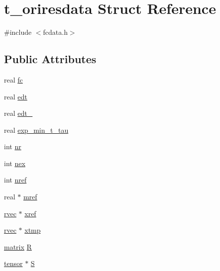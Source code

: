 \hypertarget{structt__oriresdata}{\section{t\-\_\-oriresdata \-Struct \-Reference}
\label{structt__oriresdata}
}


{\ttfamily \#include $<$fcdata.\-h$>$}

\subsection*{\-Public \-Attributes}
\begin{DoxyCompactItemize}
\item 
real \hyperlink{structt__oriresdata_a3f53eeced8bb470f9e6744c13094cb4a}{fc}
\item 
real \hyperlink{structt__oriresdata_ac62c4c96f4e26c89a5064d59eb731297}{edt}
\item 
real \hyperlink{structt__oriresdata_a129d5bae4c3e45c575cba5061f280252}{edt\-\_}
\item 
real \hyperlink{structt__oriresdata_aafe5f0c9333cdecf519edcde680afa3e}{exp\-\_\-min\-\_\-t\-\_\-tau}
\item 
int \hyperlink{structt__oriresdata_a9f809185adac20eb8ce8337a889e905d}{nr}
\item 
int \hyperlink{structt__oriresdata_a70c1520822ec66ff2d90b456eccfa497}{nex}
\item 
int \hyperlink{structt__oriresdata_a6c0a4cac66b5cdb65b662be59071d507}{nref}
\item 
real $\ast$ \hyperlink{structt__oriresdata_a19cc4db75114e30ae5138f284b109494}{mref}
\item 
\hyperlink{share_2template_2gromacs_2types_2simple_8h_aa02a552a4abd2f180c282a083dc3a999}{rvec} $\ast$ \hyperlink{structt__oriresdata_a04fdaf3b7dfc576cddd0b41cc74738fc}{xref}
\item 
\hyperlink{share_2template_2gromacs_2types_2simple_8h_aa02a552a4abd2f180c282a083dc3a999}{rvec} $\ast$ \hyperlink{structt__oriresdata_ab96af028b5a85f0d219e7905cc8aab70}{xtmp}
\item 
\hyperlink{share_2template_2gromacs_2types_2simple_8h_a7ea9c2a830d3f743b887387e33645a83}{matrix} \hyperlink{structt__oriresdata_ae91a11f0e8e3b388041198ac664892cd}{\-R}
\item 
\hyperlink{share_2template_2gromacs_2types_2simple_8h_aef0bf341f56ce75f09dbb64350488a61}{tensor} $\ast$ \hyperlink{structt__oriresdata_a7b2f6a6b276af84deb0de3ee8aa393c2}{\-S}

\end{DoxyCompactItemize}
